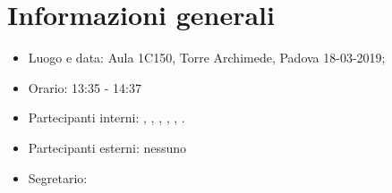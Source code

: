 \section{Informazioni generali}
\begin{itemize}
    \item Luogo e data: Aula 1C150, Torre Archimede, Padova 18-03-2019;
    \item Orario: 13:35 - 14:37
    \item Partecipanti interni: \valentin{}, \francesco{}, \daniele{}, \singh{}, \davide{}, \andrea{}.
    \item Partecipanti esterni: nessuno
    \item Segretario: \daniele{}
\end{itemize}